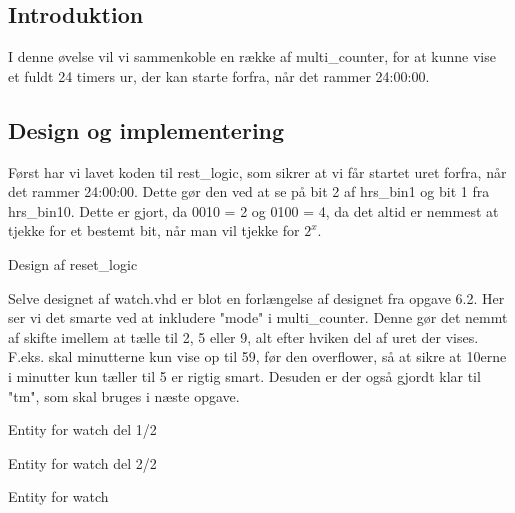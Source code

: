 \documentclass[../journal.tex]{subfiles}
\begin{document}
\subsection{Introduktion}

I denne øvelse vil vi sammenkoble en række af multi\_counter, for at kunne vise et fuldt 24 timers ur, der kan starte forfra, når det rammer 24:00:00. 

\subsection{Design og implementering}

Først har vi lavet koden til rest\_logic, som sikrer at vi får startet uret forfra, når det rammer 24:00:00. Dette gør den ved at se på bit 2 af hrs\_bin1 og bit 1 fra hrs\_bin10. Dette er gjort, da 0010 = 2 og 0100 = 4, da det altid er nemmest at tjekke for et bestemt bit, når man vil tjekke for $2^x$.

\begin{table}[H]
    \centering
      \framebox{
        \rule{8pt}{0pt}
          
  }
  \caption{Design af reset\_logic}	
  \label{src:reset}
\end{table}

Selve designet af watch.vhd er blot en forlængelse af designet fra opgave 6.2. Her ser vi det smarte ved at inkludere "mode" i multi\_counter. Denne gør det nemmt af skifte imellem at tælle til 2, 5 eller 9, alt efter hviken del af uret der vises. F.eks. skal minutterne kun vise op til 59, før den overflower, så at sikre at 10erne i minutter kun tæller til 5 er rigtig smart. Desuden er der også gjordt klar til "tm", som skal bruges i næste opgave.

\begin{table}[H]
    \centering
      \framebox{
        \rule{8pt}{0pt}
          
  }
  \caption{Entity for watch del 1/2}	
  \label{src:wtch_ent}
\end{table}

\begin{table}[H]
    \centering
      \framebox{
        \rule{8pt}{0pt}
          
  }
  \caption{Entity for watch del 2/2}	
  \label{src:watch_arch1}
\end{table}

\begin{table}[H]
    \centering
      \framebox{
        \rule{8pt}{0pt}
          
  }
  \caption{Entity for watch}	
  \label{src:watch_arch2}
\end{table}
\end{document}
